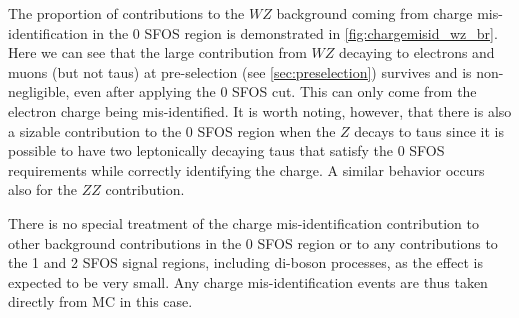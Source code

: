 The proportion of contributions to the $WZ$ background coming from 
charge mis-identification in the 0 SFOS region is demonstrated in 
\fig\ref{fig:chargemisid_wz_br}. Here we can see that the 
large contribution from $WZ$ decaying to electrons and muons (but not taus)
at pre-selection (see \sec\ref{sec:preselection})
survives and is non-negligible, even after applying the 0 SFOS cut.
This can only come from the electron charge being mis-identified.
It is worth noting, however, that there is also a sizable
contribution to the 0 SFOS region when the $Z$ decays to taus
since it is possible to have two leptonically decaying taus that satisfy
the 0 SFOS requirements while correctly identifying the charge.
A similar behavior occurs also for the $ZZ$ contribution.


There is no special treatment of the charge mis-identification contribution to 
other background contributions in the 0 SFOS region or to any contributions to the 
1 and 2 SFOS signal regions, including di-boson processes, as the effect is 
expected to be very small.  Any charge mis-identification events are thus 
taken directly from MC in this case.


